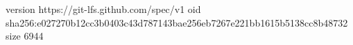 version https://git-lfs.github.com/spec/v1
oid sha256:e027270b12cc3b0403c43d787143bae256eb7267e221bb1615b5138cc8b48732
size 6944
